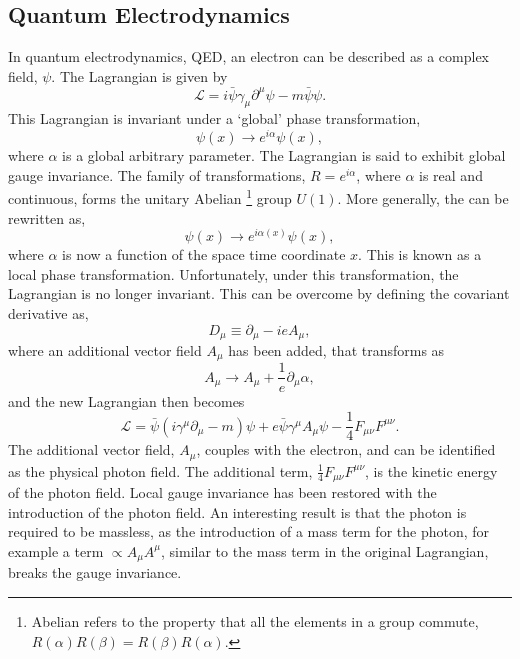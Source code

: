 \subsection{Quantum Electrodynamics}
In quantum electrodynamics, QED, an electron can be described as a complex
field, $\psi$. The Lagrangian is given by
\begin{equation}
\mathcal{L} = i \bar{\psi} \gamma_{\mu} \partial^{\mu} \psi - m \bar{\psi}\psi .
\end{equation}
This Lagrangian is invariant under a `global' phase transformation,
\begin{equation}
\psi(x) \to e^{i\alpha} \psi(x),
\label{eq:global}
\end{equation}
where $\alpha$ is a global arbitrary parameter. The Lagrangian is said to exhibit
global gauge invariance. The family of transformations, $R =
e^{i \alpha}$, where $\alpha$ is real and continuous, forms the unitary
Abelian \footnote{Abelian refers to the property that all the elements in a
group commute, $R(\alpha)R(\beta) = R(\beta)R(\alpha)$.}
group $U(1)$. 
More generally, the  can be rewritten as,
\begin{equation}
\psi(x) \to e^{i\alpha(x)} \psi(x),
\label{eq:local}
\end{equation}
where $\alpha$ is now a function of the space time coordinate $x$. This is known
as a local phase transformation. Unfortunately, under this transformation, the
Lagrangian is no longer invariant. This can be overcome by defining the
covariant derivative as,
\begin{equation}
D_{\mu} \equiv \partial_{\mu} - i e A_{\mu},
\end{equation}
where an additional vector field $A_{\mu}$ has been added, that transforms as 
\begin{equation}
A_{\mu} \to A_{\mu} + \frac{1}{e} \partial_{\mu} \alpha,
\end{equation}
and the new Lagrangian then becomes
\begin{equation}
\mathcal{L} = 
\bar{\psi}(i\gamma^{\mu}\partial_{\mu} - m)\psi + 
e \bar{\psi} \gamma^{\mu} A_{\mu} \psi - 
\frac{1}{4} F_{\mu\nu} F^{\mu\nu}. 
\end{equation}
The additional vector field, $A_{\mu}$, couples with the electron,
 and can be identified as the physical photon field. The additional
term, $\frac{1}{4} F_{\mu\nu} F^{\mu\nu}$, is the kinetic energy of the photon
field. Local gauge invariance has been restored with the introduction of the photon
field. An interesting result is that the photon is required to be massless, as the introduction of
a mass term for the photon, for example a term $\propto A_{\mu}A^{\mu}$,
similar to the mass term in the original Lagrangian, breaks
the gauge invariance.

